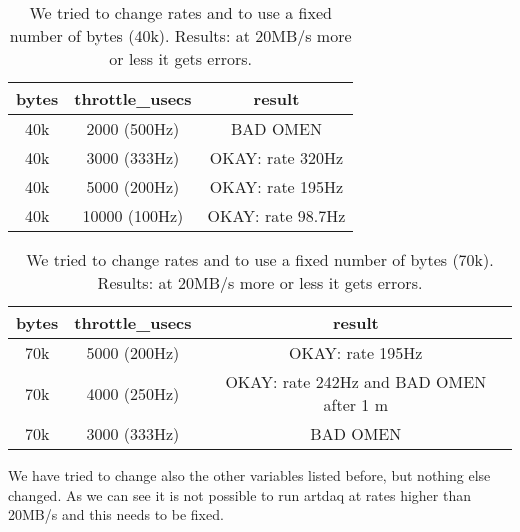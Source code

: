\documentclass[12pt]{article}
\begin{document}
\begin{center}  
\begin{table}[!h]
\centering
\begin{tabular}{c c c}
\hline
bytes & throttle\_usecs &  result\\
\hline
40k & 2000 (500Hz) & BAD OMEN  \\
40k & 3000 (333Hz) & OKAY: rate 320Hz  \\
40k & 5000 (200Hz) & OKAY: rate 195Hz  \\
40k & 10000 (100Hz) & OKAY: rate 98.7Hz \\
\end{tabular}
\caption{We tried to change rates and to use a fixed number of bytes (40k). Results: at 20MB/s more or less it gets errors.}
\end{table}\label{tab:upperlimits}
\end{center}

\begin{center}  
\begin{table}[!h]
\centering
\begin{tabular}{c c c}
\hline
bytes & throttle\_usecs &  result\\
\hline
70k & 5000 (200Hz) & OKAY: rate 195Hz  \\
70k & 4000 (250Hz) & OKAY: rate 242Hz and BAD OMEN after 1 m  \\
70k & 3000 (333Hz) & BAD OMEN  \\

\end{tabular}
\caption{We tried to change rates and to use a fixed number of bytes (70k). Results: at 20MB/s more or less it gets errors.}
\end{table}\label{tab:upperlimits}
\end{center}

We have tried to change also the other variables listed before, but nothing else changed. As we can see it is not possible to run artdaq at rates higher than 20MB/s and this needs to be fixed. 
\end{document}
